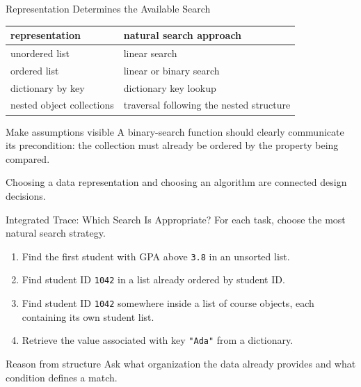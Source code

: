 \documentclass[aspectratio=169,10pt]{beamer}
\begin{document}
\begin{frame}{Representation Determines the Available Search}
  \begin{center}
    \renewcommand{\arraystretch}{1.25}
    \begin{tabular}{l|l}
      \textbf{representation} & \textbf{natural search approach} \\\hline
      unordered list & linear search \\
      ordered list & linear or binary search \\
      dictionary by key & dictionary key lookup \\
      nested object collections & traversal following the nested structure
    \end{tabular}
  \end{center}

  \begin{block}{Make assumptions visible}
    A binary-search function should clearly communicate its precondition: the collection must already be ordered by the property being compared.
  \end{block}

  \begin{keyidea}
    Choosing a data representation and choosing an algorithm are connected design decisions.
  \end{keyidea}
\end{frame}

\begin{frame}{Integrated Trace: Which Search Is Appropriate?}
  For each task, choose the most natural search strategy.

  \begin{enumerate}
    \item Find the first student with GPA above \texttt{3.8} in an unsorted list.
    \item Find student ID \texttt{1042} in a list already ordered by student ID.
    \item Find student ID \texttt{1042} somewhere inside a list of course objects, each containing its own student list.
    \item Retrieve the value associated with key \texttt{"Ada"} from a dictionary.
  \end{enumerate}

  \begin{block}{Reason from structure}
    Ask what organization the data already provides and what condition defines a match.
  \end{block}
\end{frame}
\end{document}

